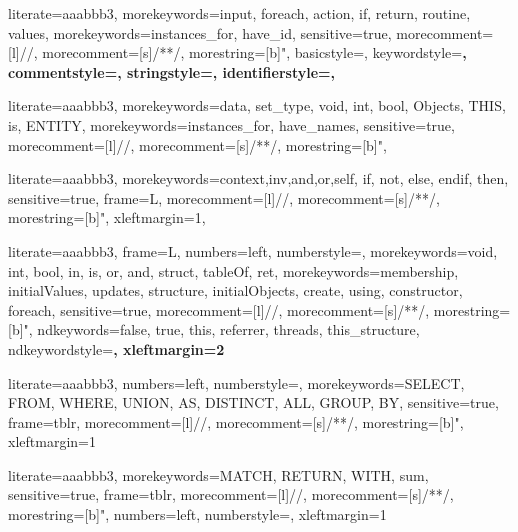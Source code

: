 
{
literate={aaa}{bbb}3,
morekeywords={input, foreach, action, if, return, routine, values},
morekeywords={instances_for, have_id},
sensitive=true,
morecomment=[l]{//},
morecomment=[s]{/*}{*/},
morestring=[b]",
basicstyle=\color{black}\large,
keywordstyle=\color{black}\large\bfseries,
commentstyle=\color{dkgreen}\large,
stringstyle=\color{purple}\large,
identifierstyle=\color{dkgray}\large,
}

{
literate={aaa}{bbb}3,
morekeywords={data, set_type, void, int, bool, Objects, THIS, is, ENTITY},
morekeywords={instances_for, have_names},
sensitive=true,
morecomment=[l]{//},
morecomment=[s]{/*}{*/},
morestring=[b]",
}

{
literate={aaa}{bbb}3,
morekeywords={context,inv,and,or,self, if, not, else, endif, then},
sensitive=true,
frame=L,
morecomment=[l]{//},
morecomment=[s]{/*}{*/},
morestring=[b]",
xleftmargin=1\parindent,
}

{
literate={aaa}{bbb}3,
frame=L, %
numbers=left,
numberstyle=\color{black}\scriptsize,
morekeywords={void, int, bool, in, is, or, and, struct, tableOf, ret},
morekeywords={membership, initialValues, updates, structure, initialObjects, create, using, constructor, foreach},
sensitive=true,
morecomment=[l]{//},
morecomment=[s]{/*}{*/},
morestring=[b]",
ndkeywords={false, true, this, referrer, threads, this_structure},
ndkeywordstyle=\color{blue}\bfseries,
xleftmargin=2\parindent
}

{
literate={aaa}{bbb}3,
numbers=left,
numberstyle=\color{black}\scriptsize,
morekeywords={SELECT, FROM, WHERE, UNION, AS, DISTINCT, ALL, GROUP, BY},
sensitive=true,
frame=tblr,
morecomment=[l]{//},
morecomment=[s]{/*}{*/},
morestring=[b]",
xleftmargin=1\parindent
}

{
literate={aaa}{bbb}3,
morekeywords={MATCH, RETURN, WITH, sum},
sensitive=true,
frame=tblr,
morecomment=[l]{//},
morecomment=[s]{/*}{*/},
morestring=[b]",
numbers=left,
numberstyle=\color{black}\scriptsize,
xleftmargin=1\parindent
}
